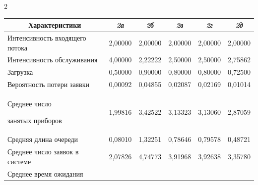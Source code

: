 \begin{multicols}{2}
\begin{table}\small


\begin{center}




\vspace*{2ex}





\begin{tabular}{|l|c|c|c|c|c|}


\hline


\multicolumn{1}{|c|}{Характеристики}    &  \textit{2а}     & \textit{2б} & \textit{2в} & \textit{2г}     & \textit{2д}\\


\hline


Интенсивность входящего потока              & 2,00000 & 2,00000 &  2,00000 & 2,00000 & 2,00000\\


\hline


Интенсивность обслуживания                  & 4,00000 & 2,22222 &  2,50000 & 2,50000 & 2,75862\\


\hline


Загрузка                                    & 0,50000 & 0,90000 &  0,80000 & 0,80000 & 0,72500\\


\hline


Вероятность потери заявки                   & 0,00092 & 0,04855 &  0,02087 & 0,02169 & 0,01014\\


\hline


Среднее число


занятых приборов                            & 1,99816 & 3,42522 &  3,13323 & 3,13060 & 2,87059\\


\hline


Средняя длина очереди                       & 0,08010 & 1,32251 &  0,78646 & 0,79578 & 0,48721\\


\hline


Среднее число заявок в системе              & 2,07826 & 4,74773 &  3,91968 & 3,92638 & 3,35780\\


\hline


Среднее время ожидания  & & & & & \\



\end{tabular}
\end{center}
\end{table}
\end{multicols}
